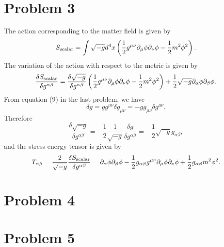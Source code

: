 \documentclass{article}
\begin{document}
\section*{Problem 3}
The action corresponding to the matter field is given by
\begin{equation}
    S_{\rm scalar} = \int \sqrt{-g} d^4x \left(
        \frac{1}{2} g^{\mu \nu} \partial_\mu \phi \partial_\nu \phi
        -\frac{1}{2}m^2\phi^2
    \right).
\end{equation}
The variation of the action with respect to the metric is given by
\begin{equation}
    \frac{\delta S_{\rm scalar}}{\delta g^{\alpha \beta}}
    = \frac{\delta \sqrt{-g}}{\delta g^{\alpha \beta}} 
    \left(\frac{1}{2}g^{\mu \nu} \partial_\mu \phi \partial_\nu \phi
    -\frac{1}{2} m^2\phi^2\right)
    +\frac{1}{2}\sqrt{-g}\partial_\alpha \phi \partial_\beta \phi.
\end{equation}
From equation (9) in the last problem, we have
\begin{equation}
    \delta g = g g^{\mu \nu} \delta g_{\mu \nu} = - g g_{\mu \nu}\delta g^{\mu \nu}.
\end{equation}
Therefore 
\begin{equation}
    \frac{\delta \sqrt{-g}}{\delta g^{\alpha \beta}}
    = -\frac{1}{2} \frac{1}{\sqrt{-g}} \frac{\delta g}{\delta g^{\alpha \beta}}
    = -\frac{1}{2} \sqrt{-g} g_{\alpha \beta},
\end{equation}
and the stress energy tensor is given by
\begin{equation}
   T_{\alpha \beta}=\frac{2}{\sqrt{-g}} \frac{\delta S_{\rm scalar}}{\delta g^{\alpha \beta}}
   = \partial_\alpha \phi \partial_\beta \phi 
   - \frac{1}{2} g_{\alpha \beta} g^{\mu \nu} \partial_\mu \phi \partial_\nu \phi
   + \frac{1}{2} g_{\alpha \beta} m^2 \phi^2.
\end{equation}
\section*{Problem 4}



\section*{Problem 5}
\end{document}
